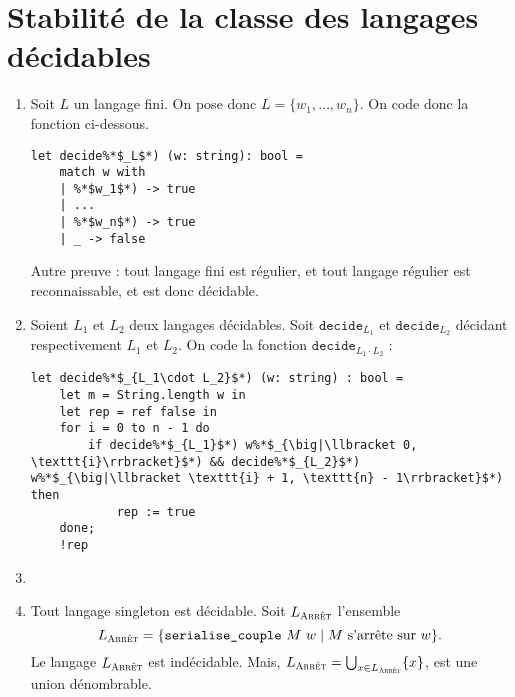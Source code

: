 \section{Stabilité de la classe des langages décidables}

\begin{enumerate}
	\item Soit $L$\/ un langage fini. On pose donc $L = \{w_1, \ldots, w_n\}$. On code donc la fonction ci-dessous.
		\begin{lstlisting}[language=caml,caption=Fonction décidant d'un langage fini]
let decide%*$_L$*) (w: string): bool =
	match w with
	| %*$w_1$*) -> true
	| ...
	| %*$w_n$*) -> true
	| _ -> false
		\end{lstlisting}
		Autre preuve : tout langage fini est régulier, et tout langage régulier est reconnaissable, et est donc décidable.
	\item Soient $L_1$\/ et $L_2$\/ deux langages décidables. Soit $\texttt{decide}_{L_1}$\/ et $\texttt{decide}_{L_2}$\/ décidant respectivement $L_1$\/ et $L_2$. On code la fonction $\texttt{decide}_{L_1\cdot L_2}$\/ :
		\begin{lstlisting}[language=caml,caption=Fonction décidant d'une concaténation de langages décidables]
let decide%*$_{L_1\cdot L_2}$*) (w: string) : bool =
	let m = String.length w in
	let rep = ref false in
	for i = 0 to n - 1 do
		if decide%*$_{L_1}$*) w%*$_{\big|\llbracket 0, \texttt{i}\rrbracket}$*) && decide%*$_{L_2}$*) w%*$_{\big|\llbracket \texttt{i} + 1, \texttt{n} - 1\rrbracket}$*) then
			rep := true
	done;
	!rep
		\end{lstlisting}
	\item 
	\item Tout langage singleton est décidable. Soit $L_{\text{\textsc{Arrêt}}}$\/ l'ensemble \[
			L_{\text{\textsc{Arrêt}}} = \{\texttt{serialise\_couple}\ M\ w  \mid M \text{ s'arrête sur } w\}
		.\]
		Le langage $L_{\textsc{Arrêt}}$\/ est indécidable. Mais, $L_{\textsc{Arrêt}} = \bigcup_{x \in L_{\textsc{Arrêt}}} \{x\}$, est une union dénombrable.
\end{enumerate}

